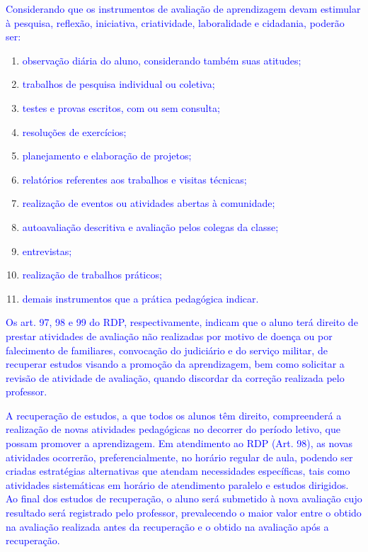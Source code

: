 \documentclass{../../modelos/latex-shared/ifsc-ppc}
\newcommand{\revisao}[1]{\textcolor{blue}{#1}}
\newcommand{\revisao}[1]{#1}
\begin{document}
\revisao{Considerando que os instrumentos de avaliação de aprendizagem devam estimular à pesquisa, reflexão, iniciativa, criatividade, laboralidade e cidadania, poderão ser:}
\begin{enumerate}[label=\alph*)]
    \item \revisao{observação diária do aluno, considerando também suas atitudes;}
    \item \revisao{trabalhos de pesquisa individual ou coletiva;}
    \item \revisao{testes e provas escritos, com ou sem consulta;}
    \item \revisao{resoluções de exercícios;}
    \item \revisao{planejamento e elaboração de projetos;}
    \item \revisao{relatórios referentes aos trabalhos e visitas técnicas;}
    \item \revisao{realização de eventos ou atividades abertas à comunidade;}
    \item \revisao{autoavaliação descritiva e avaliação pelos colegas da classe;}
    \item \revisao{entrevistas;}
    \item \revisao{realização de trabalhos práticos;}
    \item \revisao{demais instrumentos que a prática pedagógica indicar.}
\end{enumerate}

\revisao{Os art. 97, 98 e 99 do RDP, respectivamente, indicam que o aluno terá direito de prestar atividades de avaliação não realizadas por motivo de doença ou por falecimento de familiares, convocação do judiciário e do serviço militar, de recuperar estudos visando a promoção da aprendizagem, bem como solicitar a revisão de atividade de avaliação, quando discordar da correção realizada pelo professor.}

\revisao{A recuperação de estudos, a que todos os alunos têm direito, compreenderá a realização de novas atividades pedagógicas no decorrer do período letivo, que possam promover a aprendizagem. Em atendimento ao RDP (Art. 98), as novas atividades ocorrerão, preferencialmente, no horário regular de aula, podendo ser criadas estratégias alternativas que atendam necessidades específicas, tais como atividades sistemáticas em horário de atendimento paralelo e estudos dirigidos. Ao final dos estudos de recuperação, o aluno será submetido à nova avaliação cujo resultado será registrado pelo professor, prevalecendo o maior valor entre o obtido na avaliação realizada antes da recuperação e o obtido na avaliação após a recuperação.}
\end{document}
